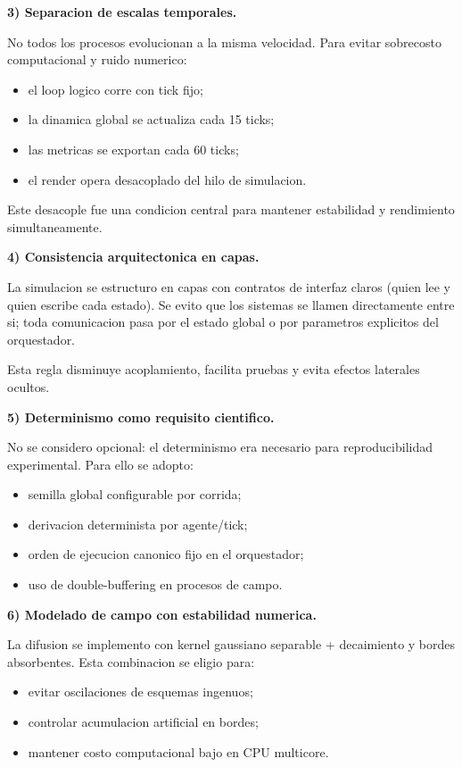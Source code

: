 \documentclass[11pt]{article}
\begin{document}
\textbf{3) Separacion de escalas temporales.}

No todos los procesos evolucionan a la misma velocidad. Para evitar sobrecosto computacional y ruido numerico:

\begin{itemize}
  \item el loop logico corre con tick fijo;
  \item la dinamica global se actualiza cada 15 ticks;
  \item las metricas se exportan cada 60 ticks;
  \item el render opera desacoplado del hilo de simulacion.
\end{itemize}

Este desacople fue una condicion central para mantener estabilidad y rendimiento simultaneamente.

\textbf{4) Consistencia arquitectonica en capas.}

La simulacion se estructuro en capas con contratos de interfaz claros (quien lee y quien escribe cada estado). Se evito que los sistemas se llamen directamente entre si; toda comunicacion pasa por el estado global o por parametros explicitos del orquestador.

Esta regla disminuye acoplamiento, facilita pruebas y evita efectos laterales ocultos.

\textbf{5) Determinismo como requisito cientifico.}

No se considero opcional: el determinismo era necesario para reproducibilidad experimental. Para ello se adopto:

\begin{itemize}
  \item semilla global configurable por corrida;
  \item derivacion determinista por agente/tick;
  \item orden de ejecucion canonico fijo en el orquestador;
  \item uso de double-buffering en procesos de campo.
\end{itemize}

\textbf{6) Modelado de campo con estabilidad numerica.}

La difusion se implemento con kernel gaussiano separable + decaimiento y bordes absorbentes. Esta combinacion se eligio para:

\begin{itemize}
  \item evitar oscilaciones de esquemas ingenuos;
  \item controlar acumulacion artificial en bordes;
  \item mantener costo computacional bajo en CPU multicore.
\end{itemize}
\end{document}
